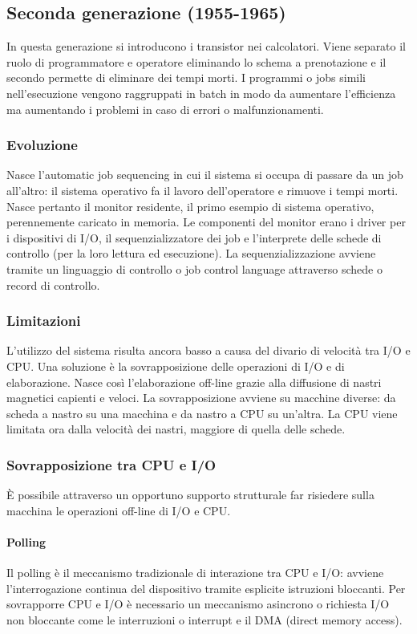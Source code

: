 \subsection{Seconda generazione (1955-1965)}
In questa generazione si introducono i transistor nei calcolatori. Viene separato il ruolo di programmatore e operatore eliminando lo schema  a prenotazione e il secondo permette di eliminare dei tempi morti. 
I programmi o jobs simili nell'esecuzione vengono raggruppati in batch in modo da aumentare l'efficienza ma aumentando i problemi in caso di errori o malfunzionamenti. 
\subsubsection{Evoluzione}
Nasce l'automatic job sequencing in cui il sistema si occupa di passare da un job all'altro: il sistema operativo fa il lavoro dell'operatore e rimuove i tempi morti. Nasce pertanto il monitor residente, il primo 
esempio di sistema operativo, perennemente caricato in memoria. Le componenti del monitor erano i driver per i dispositivi di I/O, il sequenzializzatore dei job e l'interprete delle schede di controllo (per la loro
lettura ed esecuzione). La sequenzializzazione avviene tramite un linguaggio di controllo o job control language attraverso schede o record di controllo. 
\subsubsection{Limitazioni}
L'utilizzo del sistema risulta ancora basso a causa del divario di velocit\`a tra I/O e CPU. Una soluzione \`e la sovrapposizione delle operazioni di I/O e di elaborazione. Nasce cos\`i l'elaborazione off-line grazie 
alla diffusione di nastri magnetici capienti e veloci. La sovrapposizione avviene su macchine diverse: da scheda a nastro su una macchina e da nastro a CPU su un'altra. La CPU viene limitata ora dalla velocit\`a dei
nastri, maggiore di quella delle schede. 
\subsubsection{Sovrapposizione tra CPU e I/O}
\`E possibile attraverso un opportuno supporto strutturale far risiedere sulla macchina le operazioni off-line di I/O e CPU. 
\paragraph{Polling}
Il polling \`e il meccanismo tradizionale di interazione tra CPU e I/O: avviene l'interrogazione continua del dispositivo tramite esplicite istruzioni bloccanti. Per sovrapporre CPU e I/O \`e necessario un 
meccanismo asincrono o richiesta  I/O non bloccante come le interruzioni o interrupt e il DMA (direct memory access). 
